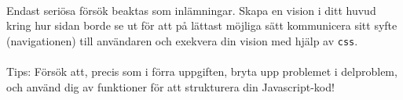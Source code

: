 \documentclass[12pt]{article}
\begin{document}
  \paragraph{}
  Endast seriösa försök beaktas som inlämningar. Skapa en vision i ditt huvud kring hur sidan borde se ut för att på lättast möjliga sätt kommunicera sitt syfte (navigationen) till användaren och exekvera din vision med hjälp av \texttt{css}.

  \paragraph{}
  Tips: Försök att, precis som i förra uppgiften, bryta upp problemet i delproblem, och använd dig av funktioner för att strukturera din Javascript-kod!
\end{document}
